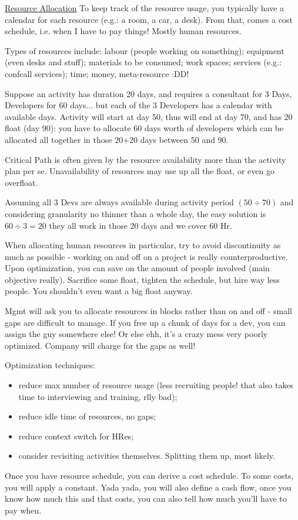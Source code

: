 \newpage
\noindent \underline{Resource Allocation}
\noindent To keep track of the resource usage, you typically have a calendar for each resource (e.g.: a room, a car, a desk). From that, comes a cost schedule, i.e. when I have to pay things! Mostly human resources. 

\noindent Types of resources include: labour (people working on something); equipment (even desks and stuff); materials to be consumed; work spaces; services (e.g.: confcall services); time; money, meta-resource :DD!

\noindent Suppose an activity has duration 20 days, and requires a consultant for 3 Days, Developers for 60 days... but each of the 3 Developers has a calendar with available days. Activity will start at day 50, thus will end at day 70, and has 20 float (day 90): you have to allocate 60 days worth of developers which can be allocated all together in those 20+20 days between 50 and 90.

\noindent Critical Path is often given by the resource availability more than the activity plan per se. Unavailability of resources may use up all the float, or even go overfloat. 

\noindent Assuming all 3 Devs are always available during activity period $(50\div70)$ and considering granularity no thinner than a whole day, the easy solution is $60\div3=20$ they all work in those 20 days and we cover 60 Hr.

\noindent When allocating human resources in particular, try to avoid discontinuity as much as possible - working on and off on a project is really counterproductive. Upon optimization, you can save on the amount of people involved (main objective really). Sacrifice some float, tighten the schedule, but hire way less people. You shouldn't even want a big float anyway.

\noindent Mgmt will ask you to allocate resources in blocks rather than on and off - small gaps are difficult to manage. If you free up a chunk of days for a dev, you can assign the guy somewhere else! Or else ehh, it's a crazy mess very poorly optimized. Company will charge for the gaps as well!

\noindent Optimization techniques:
\begin{itemize}
    \item reduce max number of resource usage (less recruiting people! that also takes time to interviewing and training, rlly bad);
    \item reduce idle time of resources, no gaps;
    \item reduce context switch for HRes;
    \item consider revisiting activities themselves. Splitting them up, most likely.
\end{itemize}

\noindent Once you have resource schedule, you can derive a cost schedule. To some costs, you will apply a constant. Yada yada, you will also define a cash flow, once you know how much this and that costs, you can also tell how much you'll have to pay when.

\noindent 